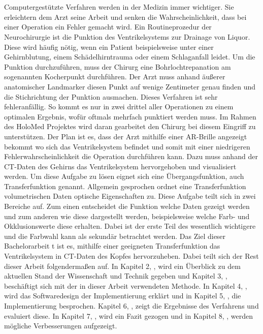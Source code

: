 \chapter{}
\label{sec:Introduction}



Computergestützte Verfahren werden in der Medizin immer wichtiger. Sie erleichtern dem Arzt seine Arbeit und senken die Wahrscheinlichkeit, dass bei einer Operation ein Fehler gemacht wird.
\newline
{}
Ein Routineprozedur der Neurochirurgie ist die Punktion des Ventrikelsystems zur Drainage von Liquor. Diese wird häufig nötig, wenn ein Patient beispielsweise unter einer Gehirnblutung, einem Schädelhirntrauma oder einem Schlaganfall leidet. Um die Punktion durchzuführen, muss der Chirurg eine Bohrlochtrepanation am sogenannten Kocherpunkt durchführen. Der Arzt muss anhand äußerer anatomischer Landmarker diesen Punkt auf wenige Zentimeter genau finden und die Stichrichtung der Punktion ausmachen. Dieses Verfahren ist sehr fehleranfällig. So kommt es nur in zwei drittel aller Operationen zu einem optimalen Ergebnis, wofür oftmals mehrfach punktiert werden muss.
\newline
Im Rahmen des HoloMed Projektes wird daran gearbeitet den Chirurg bei diesem Eingriff zu unterstützen. Der Plan ist es, dass der Arzt mithilfe einer AR-Brille angezeigt bekommt wo sich das Ventrikelsystem befindet und somit mit einer niedrigeren Fehlerwahrscheinlichkeit die Operation durchführen kann.
\newline
Dazu muss anhand der CT-Daten des Gehirns das Ventrikelsystem hervorgehoben und visualisiert werden. Um diese Aufgabe zu lösen eignet sich eine Übergangsfunktion, auch Transferfunktion genannt.
\newline
Allgemein gesprochen ordnet eine Transferfunktion volumetrischen Daten optische Eigenschaften zu. Diese Aufgabe teilt sich in zwei Bereiche auf. Zum einen entscheidet die Funktion welche Daten gezeigt werden und zum anderen wie diese dargestellt werden, beispielsweise welche Farb- und Okklusionswerte diese erhalten. Dabei ist der erste Teil des wesentlich wichtigere und die Farbwahl kann als sekundär betrachtet werden.
\newline
Das Ziel dieser Bachelorarbeit t ist es, mithilfe einer geeigneten Transferfunktion das Ventrikelsystem in CT-Daten des Kopfes hervorzuheben.
\newline
{}
Dabei teilt sich der Rest dieser Arbeit folgendermaßen auf. In Kapitel 2, , wird ein Überblick zu dem aktuellen Stand der Wissenschaft und Technik gegeben und Kapitel 3, , beschäftigt sich mit der in dieser Arbeit verwendeten Methode. In Kapitel 4, , wird das Softwaredesign der Implementierung erklärt und in Kapitel 5, , die Implementierung besprochen. Kapitel 6, , zeigt die Ergebnisse des Verfahrens und evaluiert diese. In Kapitel 7, , wird ein Fazit gezogen und in Kapitel 8, , werden mögliche Verbesserungen aufgezeigt.